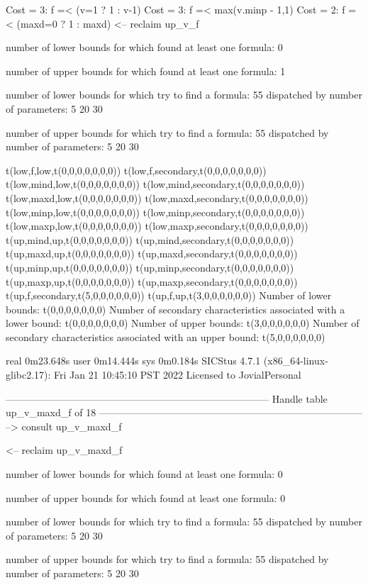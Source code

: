 Cost =  3:  f =< (v=1 ? 1 : v-1)
Cost =  3:  f =< max(v.minp - 1,1)
Cost =  2:  f =< (maxd=0 ? 1 : maxd)
<-- reclaim up_v_f

number of lower bounds for which found at least one formula: 0

number of upper bounds for which found at least one formula: 1

number of lower bounds for which try to find a formula: 55
dispatched by number of parameters: 5  20  30

number of upper bounds for which try to find a formula: 55
dispatched by number of parameters: 5  20  30

t(low,f,low,t(0,0,0,0,0,0,0))
t(low,f,secondary,t(0,0,0,0,0,0,0))
t(low,mind,low,t(0,0,0,0,0,0,0))
t(low,mind,secondary,t(0,0,0,0,0,0,0))
t(low,maxd,low,t(0,0,0,0,0,0,0))
t(low,maxd,secondary,t(0,0,0,0,0,0,0))
t(low,minp,low,t(0,0,0,0,0,0,0))
t(low,minp,secondary,t(0,0,0,0,0,0,0))
t(low,maxp,low,t(0,0,0,0,0,0,0))
t(low,maxp,secondary,t(0,0,0,0,0,0,0))
t(up,mind,up,t(0,0,0,0,0,0,0))
t(up,mind,secondary,t(0,0,0,0,0,0,0))
t(up,maxd,up,t(0,0,0,0,0,0,0))
t(up,maxd,secondary,t(0,0,0,0,0,0,0))
t(up,minp,up,t(0,0,0,0,0,0,0))
t(up,minp,secondary,t(0,0,0,0,0,0,0))
t(up,maxp,up,t(0,0,0,0,0,0,0))
t(up,maxp,secondary,t(0,0,0,0,0,0,0))
t(up,f,secondary,t(5,0,0,0,0,0,0))
t(up,f,up,t(3,0,0,0,0,0,0))
Number of lower bounds:                                             t(0,0,0,0,0,0,0)
Number of secondary characteristics associated with a lower bound:  t(0,0,0,0,0,0,0)
Number of upper bounds:                                             t(3,0,0,0,0,0,0)
Number of secondary characteristics associated with an upper bound: t(5,0,0,0,0,0,0)

real	0m23.648s
user	0m14.444s
sys	0m0.184s
SICStus 4.7.1 (x86_64-linux-glibc2.17): Fri Jan 21 10:45:10 PST 2022
Licensed to JovialPersonal


--------------------------------------------------------------------------------
Handle table up_v_maxd_f of 18
--------------------------------------------------------------------------------
--> consult up_v_maxd_f

<-- reclaim up_v_maxd_f

number of lower bounds for which found at least one formula: 0

number of upper bounds for which found at least one formula: 0

number of lower bounds for which try to find a formula: 55
dispatched by number of parameters: 5  20  30

number of upper bounds for which try to find a formula: 55
dispatched by number of parameters: 5  20  30

